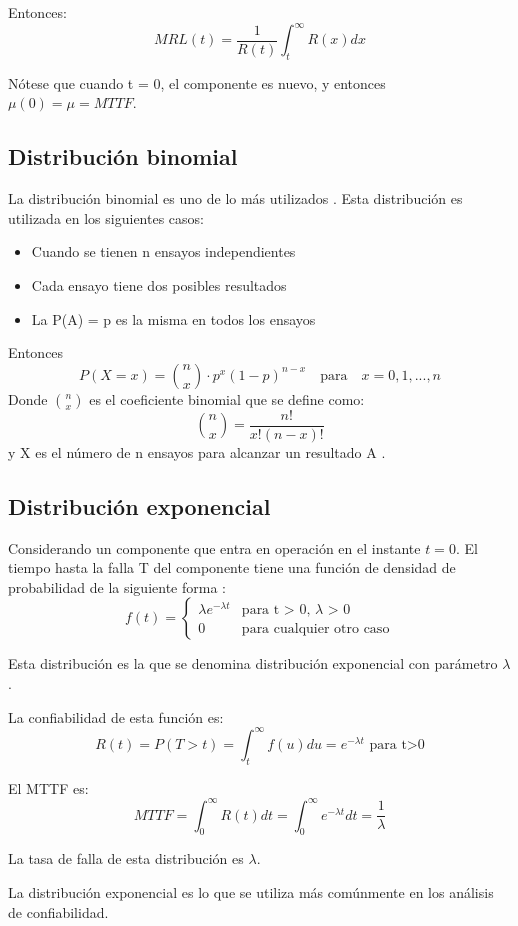 Entonces: $$MRL(t) = \frac{1}{R(t)}\int_t^\infty R(x)dx$$

Nótese que cuando t = 0, el componente es nuevo, y entonces $\mu(0) = \mu = MTTF$.

\subsection{Distribución binomial}
La distribución binomial es uno de lo más utilizados \citep{Rausand04}. Esta distribución es utilizada en los siguientes casos:
\begin{itemize}
  \item Cuando se tienen n ensayos independientes
  \item Cada ensayo tiene dos posibles resultados
  \item La P(A) = p es la misma en todos los ensayos
\end{itemize}

Entonces $$P(X=x) = {{n}\choose{x}} \cdot p^x (1-p)^{n-x} \quad \textrm{para} \quad x = 0, 1, ..., n$$ Donde ${n}\choose{x}$ es el coeficiente binomial que se define como: $${{n}\choose{x}} = \dfrac{n!}{x!(n-x)!}$$ y X es el número de n ensayos para alcanzar un resultado A \citep{Rausand04}.

\subsection{Distribución exponencial}
Considerando un componente que entra en operación en el instante $t=0$. El tiempo hasta la falla T del componente tiene una función de densidad de probabilidad de la siguiente forma \cite{Rausand04}:
$$ f(t) =\left \{
\begin{matrix}
  \lambda e^{ -\lambda t } & \text{para t > 0, } \lambda \text{ > 0}\\
  0                      & \text{para cualquier otro caso}
\end{matrix}
$$

Esta distribución es la que se denomina distribución exponencial con parámetro $\lambda$.

La confiabilidad de esta función  es: $$R(t) = P (T>t) = \int_t^\infty f(u) du  = e^{ - \lambda t} \text{ para t>0} $$

El \ac{MTTF} es: $$MTTF = \int_0^\infty R(t) dt = \int_0^\infty e^{ - \lambda t} dt  = \frac{1}{\lambda}$$

La tasa de falla de esta distribución es $\lambda$.

La distribución exponencial es lo que se utiliza más comúnmente en los análisis de confiabilidad.

